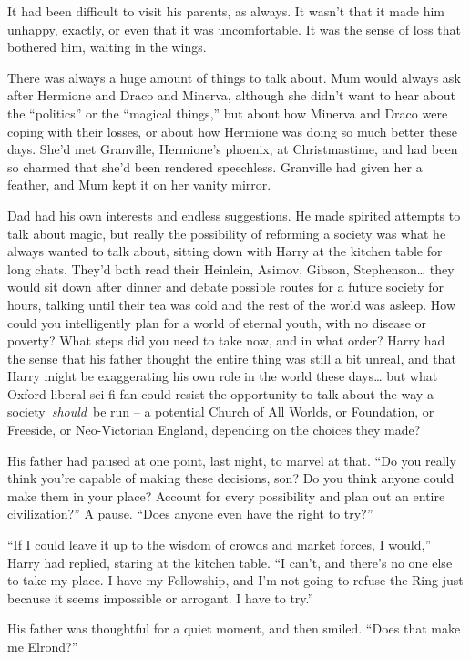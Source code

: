It had been difficult to visit his parents, as always. It wasn't that it
made him unhappy, exactly, or even that it was uncomfortable. It was the
sense of loss that bothered him, waiting in the wings.

There was always a huge amount of things to talk about. Mum would always
ask after Hermione and Draco and Minerva, although she didn't want to
hear about the ``politics'' or the ``magical things,'' but about how
Minerva and Draco were coping with their losses, or about how Hermione
was doing so much better these days. She'd met Granville, Hermione's
phoenix, at Christmastime, and had been so charmed that she'd been
rendered speechless. Granville had given her a feather, and Mum kept it
on her vanity mirror.

Dad had his own interests and endless suggestions. He made spirited
attempts to talk about magic, but really the possibility of reforming a
society was what he always wanted to talk about, sitting down with Harry
at the kitchen table for long chats. They'd both read their Heinlein,
Asimov, Gibson, Stephenson\ldots{} they would sit down after dinner and
debate possible routes for a future society for hours, talking until
their tea was cold and the rest of the world was asleep. How could you
intelligently plan for a world of eternal youth, with no disease or
poverty? What steps did you need to take now, and in what order? Harry
had the sense that his father thought the entire thing was still a bit
unreal, and that Harry might be exaggerating his own role in the world
these days\ldots{} but what Oxford liberal sci-fi fan could resist the
opportunity to talk about the way a society~\emph{should}~be run -- a
potential Church of All Worlds, or Foundation, or Freeside, or
Neo-Victorian England, depending on the choices they made?

His father had paused at one point, last night, to marvel at that. ``Do
you really think you're capable of making these decisions, son? Do you
think anyone could make them in your place? Account for every
possibility and plan out an entire civilization?'' A pause. ``Does
anyone even have the right to try?''

``If I could leave it up to the wisdom of crowds and market forces, I
would,'' Harry had replied, staring at the kitchen table. ``I can't, and
there's no one else to take my place. I have my Fellowship, and I'm not
going to refuse the Ring just because it seems impossible or arrogant. I
have to try.''

His father was thoughtful for a quiet moment, and then smiled. ``Does
that make me Elrond?''

